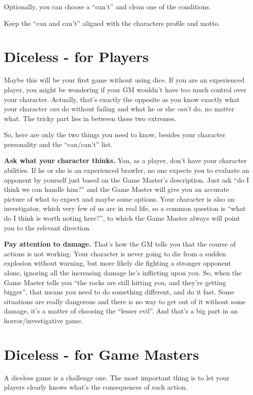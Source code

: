 \documentclass[11pt]{article}
\begin{document}
Optionally, you can choose a \enquote{can't} and clean one of the conditions.

Keep the \enquote{can and can't} aligned with the characters profile and motto.

\section{Diceless - for Players}

Maybe this will be your first game without using dice. If you are an experienced player, you might be wondering if your GM wouldn't have too much control over your character. Actually, that's exactly the opposite as you know exactly what your character \textit{can} do without failing and what he or she \textit{can't} do, no matter what. The tricky part lies in between these two extremes.

So, here are only the two things you need to know, besides your character personality and the \enquote{can/can't} list.

\textbf{Ask what your character thinks.} You, as a player, don't have your character abilities. If he or she is an experienced brawler, no one expects you to evaluate an opponent by yourself just based on the Game Master's description. Just ask \enquote{do I think we can handle him?} and the Game Master will give you an accurate picture of what to expect and maybe some options. Your character is also an investigator, which very few of us are in real life, so a common question is \enquote{what do I think is worth noting here?}, to which the Game Master always will point you to the relevant direction.

\textbf{Pay attention to damage.} That's how the GM tells you that the course of actions is not working. Your character is never going to die from a sudden explosion without warning, but more likely die fighting a stronger opponent alone, ignoring all the increasing damage he's inflicting upon you. So, when the Game Master tells you \enquote{the rocks are still hitting you, and they're getting bigger}, that means you need to do something different, and do it fast. Some situations are really dangerous and there is no way to get out of it without some damage, it's a matter of choosing the \enquote{lesser evil}. And that's a big part in an horror/investigative game.


\section{Diceless - for Game Masters}
\label{sec:org2563cf9}
A diceless game is a challenge one. The most important thing is to let your players clearly knows what's the consequences of each action.
\end{document}
